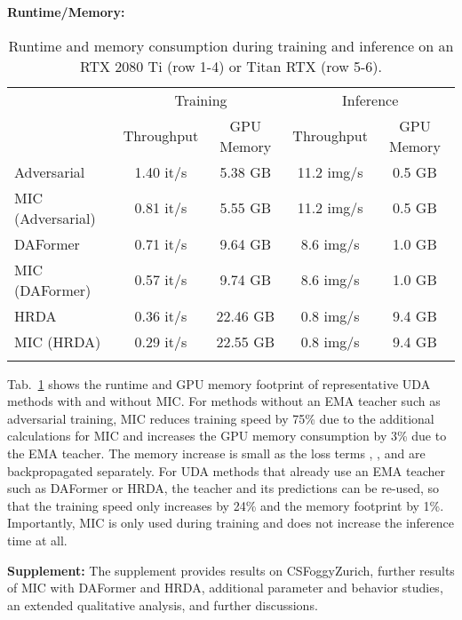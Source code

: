 \documentclass[10pt,twocolumn,letterpaper]{article}
\begin{document}
\noindent\textbf{Runtime/Memory:}
\begin{table}
\centering
\caption{Runtime and memory consumption during training and inference on an RTX 2080 Ti (row 1-4) or Titan RTX (row 5-6).}
\label{tab:benchmark}
\setlength{\tabcolsep}{3pt}
\scriptsize
\begin{tabular}{lcccc}
\hline
                & \multicolumn{2}{c}{Training} & \multicolumn{2}{c}{Inference} \\
                & Throughput    & GPU Memory   & Throughput    & GPU Memory    \\
\hline\hline
\arrayrulecolor{gray}
Adversarial~\cite{tsai2018learning} & 1.40 it/s & 5.38 GB & 11.2 img/s & 0.5 GB \\
MIC (Adversarial) & 0.81 it/s & 5.55 GB & 11.2 img/s & 0.5 GB \\
\hline
DAFormer~\cite{hoyer2021daformer}        & 0.71 it/s      & 9.64 GB       & 8.6 img/s     & 1.0 GB \\
MIC (DAFormer) & 0.57 it/s      & 9.74 GB       & 8.6 img/s     & 1.0 GB  \\
\hline
HRDA~\cite{hoyer2022hrda} & 0.36 it/s & 22.46 GB & 0.8 img/s & 9.4 GB\\
MIC (HRDA) & 0.29 it/s & 22.55 GB & 0.8 img/s & 9.4 GB\\
\arrayrulecolor{black}
\hline
\end{tabular}
\end{table} Tab.~\ref{tab:benchmark} shows the runtime and GPU memory footprint of representative UDA methods with and without MIC. For methods without an EMA teacher such as adversarial training, MIC reduces training speed by 75\% due to the additional calculations for MIC and increases the GPU memory consumption by 3\% due to the EMA teacher. The memory increase is small as the loss terms , , and  are backpropagated separately.
For UDA methods that already use an EMA teacher such as DAFormer or HRDA, the teacher and its predictions can be re-used, so that the training speed only increases by 24\% and the memory footprint by 1\%. 
Importantly, MIC is only used during training and does not increase the inference time at all.


\noindent\textbf{Supplement:} 
The supplement provides results on
CS\allowbreak Foggy\-Zurich,
further results of MIC with DAFormer and HRDA,
additional parameter and behavior studies,
an extended qualitative analysis, and further discussions.
\end{document}

